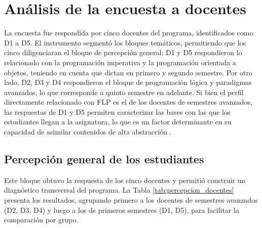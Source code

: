 \section{Análisis de la encuesta a docentes}

La encuesta fue respondida por cinco docentes del programa, identificados como D1 a D5. El instrumento segmentó los bloques temáticos, permitiendo que los cinco diligenciaran el bloque de percepción general; D1 y D5 respondieron lo relacionado con la programación imperativa y la programación orientada a objetos, teniendo en cuenta que dictan en primero y segundo semestre. Por otro lado, D2, D3 y D4 respondieron el bloque de programación lógica y paradigmas avanzados, lo que corresponde a quinto semestre en adelante. Si bien el perfil directamente relacionado con FLP es el de los docentes de semestres avanzados, las respuestas de D1 y D5 permiten caracterizar las bases con las que los estudiantes llegan a la asignatura, lo que es un factor determinante en su capacidad de asimilar contenidos de alta abstracción \cite{zagami2023}.

\subsection{Percepción general de los estudiantes}

Este bloque obtuvo la respuesta de los cinco docentes y permitió construir un diagnóstico transversal del programa. La Tabla \ref{tab:percepcion_docentes} presenta los resultados, agrupando primero a los docentes de semestres avanzados (D2, D3, D4) y luego a los de primeros semestres (D1, D5), para facilitar la comparación por grupo.

